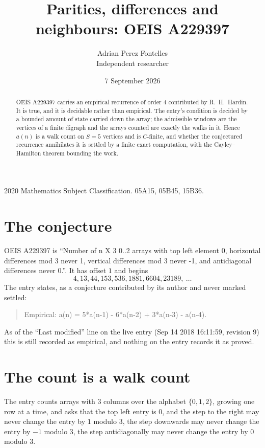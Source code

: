 \documentclass[11pt,a4paper]{article}
\title{Parities, differences and neighbours: OEIS A229397}
\author{Adrian Perez Fontelles\\ \small Independent researcher}
\date{7 September 2026}
\theoremstyle{plain}
\theoremstyle{definition}
\begin{document}
\maketitle

\begin{abstract}
OEIS A229397 carries an empirical recurrence of order $4$ contributed by R.~H.~Hardin. It is
true, and it is decidable rather than empirical. The entry's condition is decided by a bounded amount of state carried down the array; the
admissible windows are the vertices of a finite digraph and the arrays counted are exactly the
walks in it. Hence $a(n)$ is a walk count on $S=5$ vertices and is $C$-finite, and whether the
conjectured recurrence annihilates it is settled by a finite exact computation, with the
Cayley--Hamilton theorem bounding the work.
\end{abstract}

\noindent\small 2020 Mathematics Subject Classification. 05A15, 05B45, 15B36.\normalsize

\section{The conjecture}

OEIS A229397 is ``Number of n X 3 0..2 arrays with top left element 0, horizontal differences mod 3 never 1, vertical differences mod 3 never -1, and antidiagonal differences never 0.''. It has offset $1$ and begins
\[
4, 13, 44, 153, 536, 1881, 6604, 23189,\ \dots
\]
The entry states, as a conjecture contributed by its author and never marked settled:
\begin{quote}
Empirical: a(n) = 5*a(n-1) - 6*a(n-2) + 3*a(n-3) - a(n-4).
\end{quote}
As of the ``Last modified'' line on the live entry (Sep 14 2018 16:11:59, revision 9) this is still
recorded as empirical, and nothing on the entry records it as proved.

\section{The count is a walk count}

The entry counts arrays with $3$ columns over the alphabet $\{0,1,2\}$, growing one row at a time, and asks that the top left entry is $0$, and the step to the right may never change the entry by $1$ modulo $3$, the step downwards may never change the entry by $-1$ modulo $3$, the step antidiagonally may never change the entry by $0$ modulo $3$.
\end{document}
